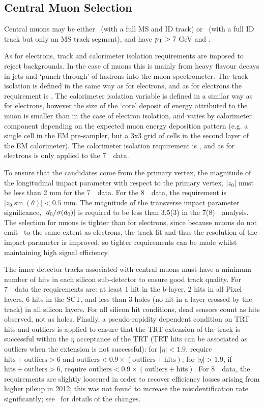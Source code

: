 \subsection{Central Muon Selection}

Central muons may be either \combined\ (with a full MS and ID track) or
\segmentTagged\ (with a full ID track but only an MS track segment), and have $p_{\mathrm{T}}>7$ GeV
and .

As for electrons, track and calorimeter isolation requirements are imposed to
reject backgrounds. In the case of muons this is mainly from heavy flavour
decays in jets and `punch-through' of hadrons into the muon spectrometer.  The
track isolation is defined in the same way as for electrons, and as for
electrons the requirement
is .  The calorimeter isolation variable is defined in a
similar way as for electrons, however the size of the `core' deposit of energy
attributed to the muon is smaller than in the case of electron isolation, and
varies by calorimeter component depending on the expected muon energy deposition
pattern (e.g. a single cell in the EM pre-sampler, but a 3x3 grid of cells in the second
layer of the EM calorimeter). The calorimeter isolation requirement is
, and as for electrons is only applied to the 7~\tev\ data.

To ensure that the candidates come from the primary vertex, the magnitude of the
longitudinal impact parameter with respect to the primary vertex, $|z_0|$ must
be less than 2 mm for the 7~\tev\ data. For the 8~\tev\ data, the requirement is
$|z_0\sin(\theta)|<0.5$ mm. The magnitude of the transverse impact parameter
significance, $|d_{0} / \sigma (d_{0} )|$ is required to be less than 3.5(3) in the 7(8)~\tev\
analysis. The selection for muons is tighter than for electrons, since because
muons do not emit \brem\ to the same extent as electrons, the track fit and thus
the resolution of the impact parameter is improved, so tighter requirements can
be made whilst maintaining high signal efficiency.

The inner detector tracks associated with central muons must have a minimum
number of hits in each silicon sub-detector to ensure good track quality. For
7~\tev\ data the requirements are: at least 1 hit in the b-layer, $2$ hits in all Pixel
layers, $6$ hits in the SCT, and less than 3 holes (no hit in a layer crossed by the
track) in all silicon layers. For all silicon hit conditions, dead sensors count
as hits observed, not as holes.  Finally, a pseudo-rapidity dependent condition
on TRT hits and outliers is applied to ensure that the TRT extension of the
track is successful within the $\eta$ acceptance of the TRT (TRT hits can be
associated as outliers when the extension is not successful): for $|\eta| <
1.9$, require $\mathrm{hits}+\mathrm{outliers} > 6$ and $\mathrm{outliers} < 0.9
\times (\mathrm{outliers}+\mathrm{hits})$; for $|\eta| > 1.9$, if
$\mathrm{hits}+\mathrm{outliers} > 6$, require $\mathrm{outliers} < 0.9 \times
(\mathrm{outliers}+\mathrm{hits})$. For 8~\tev\ data, the
requirements are slightly loosened in order to recover efficiency losses arising
from higher pileup in 2012; this was not found to increase the misidentification rate significantly;
see~\tab{objsel-mu} for details of the changes.

